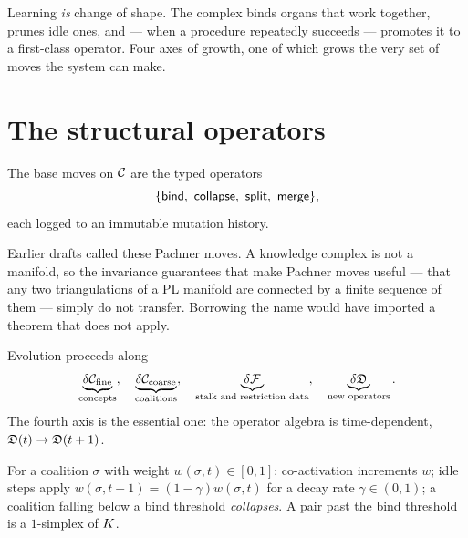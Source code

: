 \begin{workplan}{\Recast}
\end{workplan}

\begin{intu}\Intu
Learning \emph{is} change of shape. The complex binds organs that work
together, prunes idle ones, and --- when a procedure repeatedly succeeds
--- promotes it to a first-class operator. Four axes of growth, one of
which grows the very set of moves the system can make.
\end{intu}

\section{The structural operators}

\begin{definition}\label{def:ops}
The base moves on $\mathcal{C}$ are the typed operators
\[
  \{\opbind,\ \opcollapse,\ \opsplit,\ \opmerge\},
\]
each logged to an immutable mutation history.
\end{definition}

\begin{remark}
Earlier drafts called these Pachner moves. A knowledge complex is not a
manifold, so the invariance guarantees that make Pachner moves useful
--- that any two triangulations of a PL manifold are connected by a
finite sequence of them --- simply do not transfer. Borrowing the name
would have imported a theorem that does not apply.
\end{remark}

\begin{construction}\label{con:axes}
Evolution proceeds along
\[
  \underbrace{\delta\mathcal{C}_{\text{fine}}}_{\text{concepts}},\quad
  \underbrace{\delta\mathcal{C}_{\text{coarse}}}_{\text{coalitions}},\quad
  \underbrace{\delta\mathcal{F}}_{\text{stalk and restriction data}},\quad
  \underbrace{\delta\mathfrak{D}}_{\text{new operators}} .
\]
The fourth axis is the essential one: the operator algebra is
time-dependent, $\mathfrak{D}(t)\to\mathfrak{D}(t+1)$.
\end{construction}

\begin{definition}\label{def:hebb}
For a coalition $\sigma$ with weight $w(\sigma,t)\in[0,1]$:
co-activation increments $w$; idle steps apply
$w(\sigma,t+1)=(1-\gamma)w(\sigma,t)$ for a decay rate $\gamma\in(0,1)$;
a coalition falling below a bind threshold \emph{collapses}. A pair past
the bind threshold is a $1$-simplex of $K$.
\end{definition}

